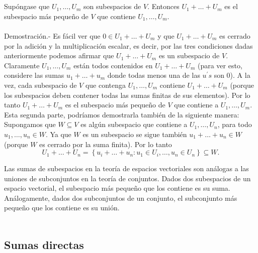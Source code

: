\setcounter{mydef}{38}
\begin{myteo}\,\\\\ 
    Supóngase que $U_1,\ldots,U_m$ son subespacios de $V$. Entonces $U_1+\ldots +U_m$ es el subespacio más pequeño de $V$ que contiene $U_1,\ldots, U_m$.\\\\
	Demostración.-\; Es fácil ver que $0\in U_1+\ldots + U_m$ y que $U_1+\ldots +U_m$ es cerrado por la adición y la multiplicación escalar, es decir, por las tres condiciones dadas anteriormente podemos afirmar que $U_1+\ldots + U_m$ es un subespacio de $V$.\\
	Claramente $U_1,\ldots, U_m$ están todos contenidos en $U_1 + \ldots + U_m$ (para ver esto, considere las sumas $u_1+\ldots + u_m$ donde todas menos una de las $u^{'}s$ son $0$). A la vez, cada subespacio de $V$ que contenga $U_1,\ldots , U_m$ contiene $U_1 + \ldots + U_m$ (porque los subespacios deben contener todas las sumas finitas de sus elementos). Por lo tanto $U_1+\ldots + U_m$ es el subespacio más pequeño de $V$ que contiene a $U_1,\ldots , U_m$.\\
	Esta segunda parte, podríamos demostrarla también de la siguiente manera: Supongamos que $W\subseteq V$ es algún subespacio que contiene a $U_1,\ldots,U_n$, para todo $u_1,\ldots,u_n\in W$. Ya que $W$ es un subespacio se sigue también $u_1+\ldots+u_n\in W$ (porque $W$ es cerrado por la suma finita). Por lo tanto
	$$U_1+\ldots+U_n = \left\{u_i+\ldots + u_n : u_1\in U_i,\ldots , u_n \in U_n\right\}\subseteq W.$$
\end{myteo}
Las sumas de subespacios en la teoría de espacios vectoriales son análogas a las uniones de subconjuntos en la teoría de conjuntos. Dados dos subespacios de un espacio vectorial, el subespacio más pequeño que los contiene es su suma. Análogamente, dados dos subconjuntos de un conjunto, el subconjunto más pequeño que los contiene es su unión.\\\\


\subsection{Sumas directas}


